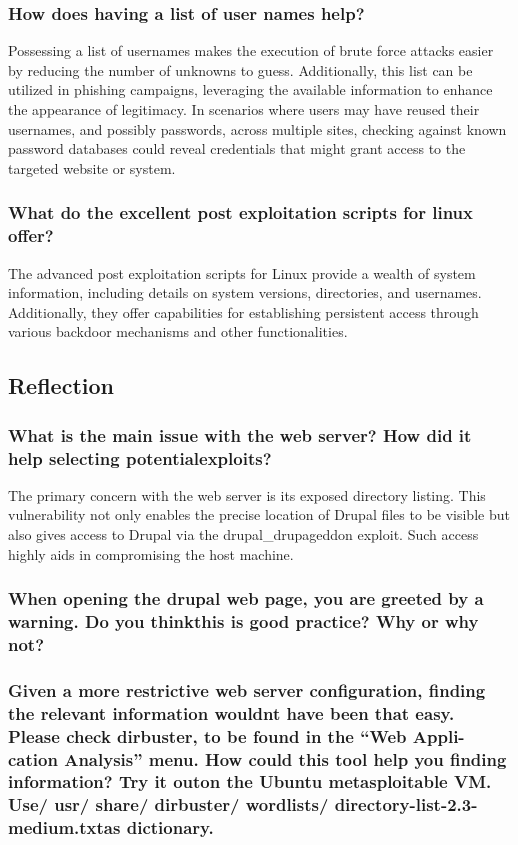 \subsubsection{How does having a list of user names help?}
Possessing a list of usernames makes the execution of brute force attacks easier by reducing the number of unknowns to guess.
Additionally, this list can be utilized in phishing campaigns, leveraging the available information to enhance the appearance of legitimacy.
In scenarios where users may have reused their usernames, and possibly passwords, across multiple sites,
checking against known password databases could reveal credentials that might grant access to the targeted website or system.


\subsubsection{What do the excellent post exploitation scripts for linux offer?}
The advanced post exploitation scripts for Linux provide a wealth of system information, including details on system versions, directories, and usernames.
Additionally, they offer capabilities for establishing persistent access through various backdoor mechanisms and other functionalities.


\subsection{Reflection}

\subsubsection{What is the main issue with the web server? How did it help selecting potentialexploits?}
The primary concern with the web server is its exposed directory listing.
This vulnerability not only enables the precise location of Drupal files to be visible but also gives access to Drupal via the drupal\_drupageddon exploit.
Such access highly aids in compromising the host machine.

\subsubsection{When opening the drupal web page, you are greeted by a warning. Do you thinkthis is good practice? Why or why not?}

\subsubsection{Given a more restrictive web server configuration, finding the relevant information wouldnt have been that easy. Please check dirbuster, to be found in the “Web Appli-cation Analysis” menu. How could this tool help you finding information? Try it outon the Ubuntu metasploitable VM. Use/ usr/ share/ dirbuster/ wordlists/ directory-list-2.3-medium.txtas dictionary.}

